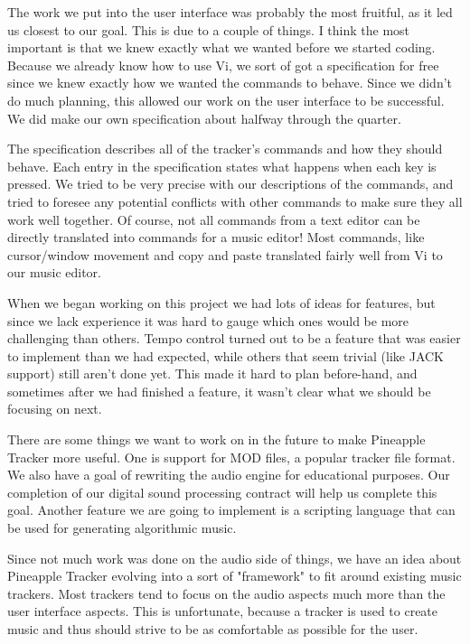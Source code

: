 \documentclass[12pt,letterpaper]{article}
\begin{document}

\par
The work we put into the user interface was probably the most fruitful, as it led us closest to our goal.
This is due to a couple of things.
I think the most important is that we knew exactly what we wanted before we started coding.
Because we already know how to use Vi, we sort of got a specification for free since we knew exactly how we wanted the commands to behave.
Since we didn't do much planning, this allowed our work on the user interface to be successful.
We did make our own specification about halfway through the quarter.

\par
The specification describes all of the tracker's commands and how they should behave.
Each entry in the specification states what happens when each key is pressed.
We tried to be very precise with our descriptions of the commands, and tried to foresee any potential conflicts with other commands to make sure they all work well together.
Of course, not all commands from a text editor can be directly translated into commands for a music editor!
Most commands, like cursor/window movement and copy and paste translated fairly well from Vi to our music editor.

\par
When we began working on this project we had lots of ideas for features, but since we lack experience it was hard to gauge which ones would be more challenging than others.
Tempo control turned out to be a feature that was easier to implement than we had expected, while others that seem trivial (like JACK support) still aren't done yet.
This made it hard to plan before-hand, and sometimes after we had finished a feature, it wasn't clear what we should be focusing on next.

\par
There are some things we want to work on in the future to make Pineapple Tracker more useful.
One is support for MOD files, a popular tracker file format.
We also have a goal of rewriting the audio engine for educational purposes.
Our completion of our digital sound processing contract will help us complete this goal.
Another feature we are going to implement is a scripting language that can be used for generating algorithmic music.

\par
Since not much work was done on the audio side of things, we have an idea about Pineapple Tracker evolving into a sort of "framework" to fit around existing music trackers.
Most trackers tend to focus on the audio aspects much more than the user interface aspects.
This is unfortunate, because a tracker is used to create music and thus should strive to be as comfortable as possible for the user.
\end{document}
